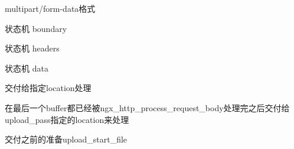 \documentclass[aspectratio=169]{ctexbeamer}
\begin{document}
\begin{frame}{\subsecname}{multipart/form-data格式}
    
    
\end{frame}

\begin{frame}{\subsecname}{状态机 boundary}
  
\end{frame}
\begin{frame}{\subsecname}{状态机 headers}
  
\end{frame}
\begin{frame}{\subsecname}{状态机 data}
  
\end{frame}

\begin{frame}{\subsecname}{交付给指定location处理}
  

  在最后一个buffer都已经被ngx\_http\_process\_request\_body处理完之后交付给upload\_pass指定的location来处理
\end{frame}

\begin{frame}{\subsecname}{交付之前的准备upload\_start\_file}
  
\end{frame}
\end{document}
